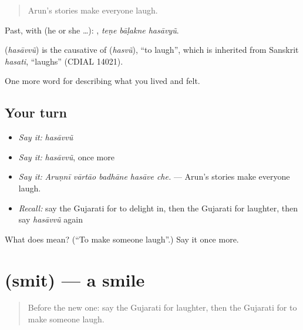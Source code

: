 \begin{quote}
Arun's stories make everyone laugh.
\end{quote}

Past, with  (he or she …):   , \emph{teṇe bāḷakne hasāvyũ}.

\begin{cousinweb}
\textbf{} (\emph{hasāvvũ}) is the causative of \textbf{} (\emph{hasvũ}), \textquotedblleft{}to laugh\textquotedblright{}, which is inherited from Sanskrit \emph{hasati}, \textquotedblleft{}laughs\textquotedblright{} (CDIAL 14021).
\end{cousinweb}

\begin{grammarlens}[title={What you've built}]
One more word for describing what you lived and felt.
\end{grammarlens}

\subsection*{Your turn}
\begin{itemize}
\raggedright
  \item \emph{Say it:} \emph{hasāvvũ}
  \item \emph{Say it:} \emph{hasāvvũ}, once more
  \item \emph{Say it:} \emph{Aruṇnī vārtāo badhāne hasāve che.} — Arun's stories make everyone laugh.
  \item \emph{Recall:} say the Gujarati for to delight in, then the Gujarati for laughter, then say \emph{hasāvvũ} again
\end{itemize}

\begin{tcolorbox}[breakable,colback=teal!4,colframe=teal!35!black,title={Before you move on}]
What does  mean? (\textquotedblleft{}To make someone laugh\textquotedblright{}.) Say it once more.
\end{tcolorbox}
\section[\texorpdfstring{\gu{સ્મિત} (smit)}{સ્મિત (smit)}]{ (smit) — a smile}

\label{lesson:GU-C448-smit}



\begin{quote}
Before the new one: say the Gujarati for laughter, then the Gujarati for to make someone laugh.
\end{quote}

